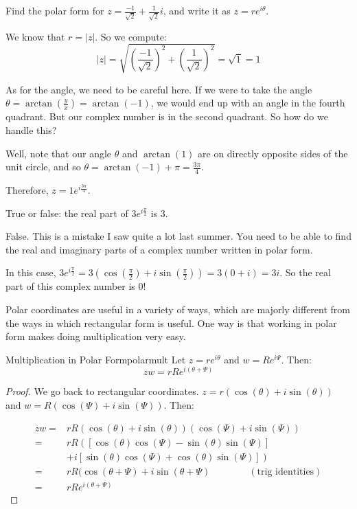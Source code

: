 \begin{ex}{}{} Find the polar form for $z = \frac{-1}{\sqrt{2}} + \frac{1}{\sqrt{2}}i$, and write it as $z = re^{i\theta}$.

We know that $r = |z|$. So we compute:
$$|z| = \sqrt{\left(\frac{-1}{\sqrt{2}}\right)^2 + \left(\frac{1}{\sqrt{2}}\right)^2} = \sqrt{1} = 1$$

As for the angle, we need to be careful here. If we were to take the angle $\theta = \arctan\left(\frac{y}{x}\right) = \arctan(-1)$, we would end up with an angle in the fourth quadrant. But our complex number is in the second quadrant. So how do we handle this?

Well, note that our angle $\theta$ and $\arctan(1)$ are on directly opposite sides of the unit circle, and so $\theta = \arctan(-1) + \pi = \frac{3 \pi}{4}$.

Therefore, $z = 1e^{i\frac{3\pi}{4}}$.

\end{ex}

\begin{ex}{}{} True or false: the real part of $3e^{i\frac{\pi}{2}}$ is $3$.

False. This is a mistake I saw quite a lot last summer. You need to be able to find the real and imaginary parts of a complex number written in polar form.

In this case, $3e^{i\frac{\pi}{2}} = 3\left(\cos\left(\frac{\pi}{2}\right) + i\sin\left(\frac{\pi}{2}\right)\right) = 3(0 + i) = 3i$. So the real part of this complex number is 0!

\end{ex}

Polar coordinates are useful in a variety of ways, which are majorly different from the ways in which rectangular form is useful. One way is that working in polar form makes doing multiplication very easy.

\begin{thmbo}{Multiplication in Polar Form}{polarmult} 
 Let $z = re^{i\theta}$ and $w = Re^{i\Psi}$. Then:
$$zw = rRe^{i(\theta + \Psi)}$$
\end{thmbo}

\begin{proof} We go back to rectangular coordinates. $z = r(\cos(\theta) + i\sin(\theta))$ and $w = R(\cos(\Psi) + i\sin(\Psi))$. Then:

\begin{align*} zw =& rR(\cos(\theta) + i\sin(\theta))(\cos(\Psi) + i\sin(\Psi))\\
=& rR\left(\left[\cos(\theta)\cos(\Psi) - \sin(\theta)\sin(\Psi)\right]\right.\\
& +\left. i\left[\sin(\theta)\cos(\Psi) + \cos(\theta)\sin(\Psi)\right]\right)\\
=&rR(\cos(\theta + \Psi) + i\sin(\theta + \Psi) \qquad\qquad (\text{trig identities})\\
=&rRe^{i(\theta + \Psi)}
\end{align*}

\end{proof}

